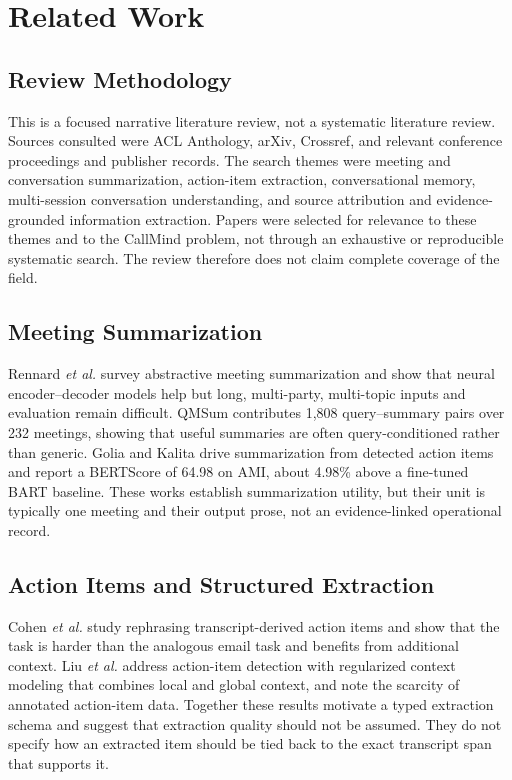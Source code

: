\documentclass[10pt,a4paper]{article}
\newcommand{\etal}{\textit{et al.}}
\begin{document}
\section{Related Work}

\subsection{Review Methodology}

This is a focused narrative literature review, not a systematic literature review. Sources
consulted were ACL Anthology, arXiv, Crossref, and relevant conference proceedings and
publisher records. The search themes were meeting and conversation summarization,
action-item extraction, conversational memory, multi-session conversation understanding,
and source attribution and evidence-grounded information extraction. Papers were selected
for relevance to these themes and to the CallMind problem, not through an exhaustive or
reproducible systematic search. The review therefore does not claim complete coverage of
the field.

\subsection{Meeting Summarization}

Rennard \etal \cite{rennard2023abstractive} survey abstractive meeting summarization and
show that neural encoder--decoder models help but long, multi-party, multi-topic inputs and
evaluation remain difficult. QMSum \cite{zhong2021qmsum} contributes 1,808 query--summary
pairs over 232 meetings, showing that useful summaries are often query-conditioned rather
than generic. Golia and Kalita \cite{golia2023action} drive summarization from detected
action items and report a BERTScore of 64.98 on AMI, about 4.98\% above a fine-tuned BART
baseline. These works establish summarization utility, but their unit is typically one
meeting and their output prose, not an evidence-linked operational record.

\subsection{Action Items and Structured Extraction}

Cohen \etal \cite{cohen2021rephrasing} study rephrasing transcript-derived action items
and show that the task is harder than the analogous email task and benefits from
additional context. Liu \etal \cite{liu2023action} address action-item detection with
regularized context modeling that combines local and global context, and note the scarcity
of annotated action-item data. Together these results motivate a typed extraction schema
and suggest that extraction quality should not be assumed. They do not specify how an
extracted item should be tied back to the exact transcript span that supports it.
\end{document}

